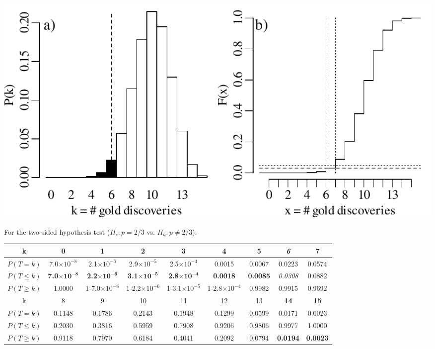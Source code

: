 \noindent\begin{minipage}[t][][b]{.6\textwidth}
  \includegraphics[width=\textwidth]{../figures/1sidedbinomialrejection15.pdf}\\
\end{minipage}
\begin{minipage}[t][][t]{.4\textwidth}
  \label{fig:1sidedbinomialrejection15}
\end{minipage}

For the two-sided hypothesis test ($H_\circ: p={2/3}$ vs. $H_a:
p\neq{2/3}$):\\

\begin{center}
\begin{tabular}{c@{\gap}c@{\gap}c@{\gap}c@{\gap}c@{\gap}c@{\gap}c@{\gap}c@{\gap}c}
    k & \textbf{0} & \textbf{1} & \textbf{2} & \textbf{3} & \textbf{4} & \textbf{5} & \textit{6} & 7 \\ \hline
    $P(T=k)$ & 7.0$\times{10}^{-8}$ & 2.1$\times{10}^{-6}$ & 2.9$\times{10}^{-5}$ & 2.5$\times{10}^{-4}$ & 0.0015 & 0.0067 & 0.0223 & 0.0574 \\
    $P({T}\leq{k})$ & \textbf{7.0}$\mathbf{\times{10}^{-8}}$ & \textbf{2.2}$\mathbf{\times{10}^{-6}}$ & \textbf{3.1}$\mathbf{\times{10}^{-5}}$ &
    \textbf{2.8}$\mathbf{\times{10}^{-4}}$ & \textbf{0.0018} & \textbf{0.0085} & \textit{0.0308} & 0.0882 \\
    $P({T}\geq{k})$ & 1.0000 & 1-7.0$\times{10}^{-8}$ & 1-2.2$\times{10}^{-6}$ & 1-3.1$\times{10}^{-5}$ & 1-2.8$\times{10}^{-4}$ & 0.9982 & 0.9915 & 0.9692 \\
    k & 8 & 9 & 10 & 11 & 12 & 13 & \textbf{14} & \textbf{15} \\ \hline
    $P(T=k)$ & 0.1148 & 0.1786 & 0.2143 & 0.1948 & 0.1299 & 0.0599 & 0.0171 & 0.0023 \\
    $P({T}\leq{k})$ & 0.2030 & 0.3816 & 0.5959 & 0.7908 & 0.9206 & 0.9806 & 0.9977 & 1.0000 \\
    $P({T}\geq{k})$ & 0.9118 & 0.7970 & 0.6184 & 0.4041 & 0.2092 & 0.0794 & \textbf{0.0194} & \textbf{0.0023}
\end{tabular}
\end{center}

